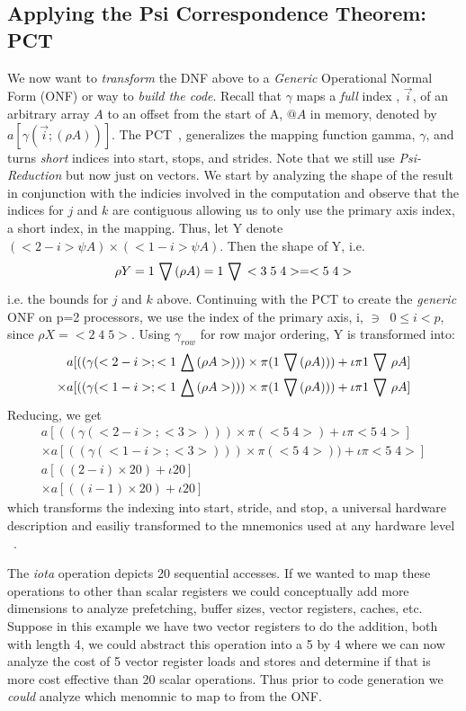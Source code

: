 \subsection* {Applying the Psi Correspondence Theorem: PCT}
We now want to {\em transform} the DNF above to a {\em Generic} Operational Normal Form (ONF) or way 
to {\em build the code}.  Recall that $\gamma$ maps a {\em full} index , $\vec i$, of an arbitrary array $A$ to an 
offset from the start of A, $@A$ in memory,  denoted by $a[\gamma(\vec i;(\rho A))]$.
The PCT~\cite{muljen94},  generalizes the mapping function 
gamma, $\gamma$,   and turns {\em short} indices into start, stops, and strides.
Note that we still use {\em Psi-Reduction} but now just on vectors.  
We start by analyzing the shape of the result in conjunction with the indicies involved
in the computation and observe that the indices for $j$ and $k$ are contiguous allowing
us to only use the primary axis index, a short index, in the mapping.
Thus, let Y denote $(<2-i> \psi A ) \times ( <1-i> \psi A)$. Then the shape of Y, i.e.
\begin{eqnarray}
\rho Y= 1 \,\bigtriangledown\, (\rho A) = 1 \,\bigtriangledown\, <3\;5\;4> = <5\;4>
\end{eqnarray}
i.e. the bounds for $j$ and $k$  above.
Continuing with the PCT to create the {\em generic} ONF on p=2 processors, we use the index of the primary axis, i, $\ni\;\;0 \leq  i < p$, since $\rho X = <2\;4\;5>$.
Using $\gamma_{row}$ for row major ordering, Y is transformed into:
\small
\begin{eqnarray}
a[ (( \gamma(<2-i >; <1 \,\bigtriangleup\, (\rho A>))) \times \pi ( 1 \,\bigtriangledown\, (\rho A))   )  + \iota \pi 1 \,\bigtriangledown\, \rho A  ] \nonumber \\
\times a[ (( \gamma(<1-i >; <1 \,\bigtriangleup\, (\rho A>))) \times \pi ( 1 \,\bigtriangledown\, (\rho A))   )  + \iota \pi 1 \,\bigtriangledown\, \rho A  ] 
\end{eqnarray}
Reducing, we get
\begin{eqnarray}
a[ (( \gamma(<2-i >; <3>))) \times \pi ( <5\;4>)  + \iota \pi <5\;4> ] \nonumber \\
\times a[ (( \gamma(<1-i >; <3>))) \times \pi ( <5\;4>)   )  + \iota \pi <5\;4>  ]\nonumber \\
a[( (2-i) \times  20)  + \iota 20 ] \nonumber \\
\times a[( (i-1) \times 20 )  + \iota 20 ]
\end{eqnarray}
\normalsize
which transforms the indexing into start, stride, and stop, a universal hardware description and easiliy transformed
to the mnemonics used at any hardware level ~\cite{fftharry}. 

The  {\em iota} operation depicts  20 sequential 
accesses. If we wanted to map these operations to other than  scalar registers
we could conceptually add more dimensions to analyze prefetching, buffer sizes, vector registers, caches, etc.
Suppose in this example we have two vector registers to do the addition, both with length 4, we could
abstract this operation into a 5 by 4 where we can now analyze the cost of 5 vector register loads and
stores and determine if that is more cost effective than 20 scalar operations. Thus prior to code generation we
{\em could} analyze which menomnic to map to from the ONF. 

